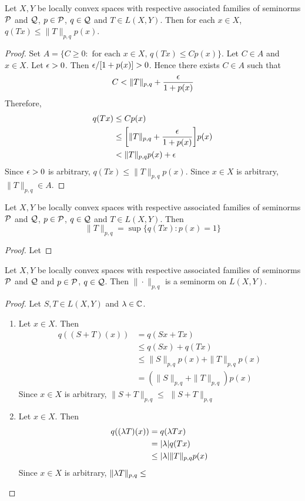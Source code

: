 \documentclass{book}
\begin{document}
\begin{ex}
	Let $X, Y$ be locally convex spaces with respective associated families of seminorms $\mathcal{P}$ and $\mathcal{Q}$, $p \in \mathcal{P}$, $q \in \mathcal{Q}$ and $T \in L(X,Y)$. Then for each $x \in X$, $q(Tx) \leq \|T\|_{p,q}p(x)$. 
\end{ex}

\begin{proof}
	Set $A = \{C \geq 0: \text{ for each $x \in X$, $q(Tx) \leq Cp(x)$} \}$. Let $C \in A$ and $x \in X$. Let $\epsilon >0$. Then $\epsilon / [1 + p(x)] > 0$. Hence there exists $C \in A$ such that $$C < \|T\|_{p,q} + \frac{\epsilon}{1 + p(x)}$$
	Therefore, 
	\begin{align*}
		q(Tx) 
		& \leq Cp(x) \\
		& \leq \bigg[\|T\|_{p,q} + \frac{\epsilon}{1 + p(x)}\bigg]p(x) \\
		& < \|T\|_{p,q}p(x) + \epsilon
	\end{align*}
	Since $\epsilon >0$ is arbitrary, $q(Tx) \leq \|T\|_{p,q}p(x) $. Since $x \in X$ is arbitrary, $\|T\|_{p,q} \in A$. 
\end{proof}

	\begin{ex}
		Let $X, Y$ be locally convex spaces with respective associated families of seminorms $\mathcal{P}$ and $\mathcal{Q}$, $p \in \mathcal{P}$, $q \in \mathcal{Q}$ and $T \in L(X,Y)$. Then 
		$$\|T\|_{p,q} = \sup \{q(Tx): p(x) = 1\}$$
	\end{ex}

	\begin{proof}
		Let 
	\end{proof}

\begin{ex}
	Let $X, Y$ be locally convex spaces with respective associated families of seminorms $\mathcal{P}$ and $\mathcal{Q}$ and $p \in \mathcal{P}$, $q \in \mathcal{Q}$. Then $\|\cdot\|_{p,q}$ is a seminorm  on $L(X,Y)$. 
\end{ex}

\begin{proof}
	Let $S, T \in L(X,Y)$ and $\lambda \in \mathbb{C}$. 
	\begin{enumerate}
		\item Let $x \in X$. Then 
		\begin{align*}
			q((S+T)(x)) 
			& = q(Sx + Tx) \\
			& \leq q(Sx) + q(Tx) \\
			& \leq \|S\|_{p,q}p(x) + \|T\|_{p,q}p(x) \\
			& =  (\|S\|_{p,q} + \|T\|_{p,q}) p(x)
		\end{align*}
		Since $x \in X$ is arbitrary, $\|S+T\|_{p,q} \leq $
		$\|S + T\|_{p,q} $
		\item Let $x \in X$. Then 
		\begin{align*}
			q((\lambda T)(x)) 
			& = q(\lambda Tx) \\
			& = |\lambda| q(Tx) \\
			& \leq |\lambda |\|T\|_{p,q}p(x) \\
		\end{align*}
		Since $x \in X$ is arbitrary, $\|\lambda T\|_{p,q} \leq $
	\end{enumerate}
\end{proof}
\end{document}
